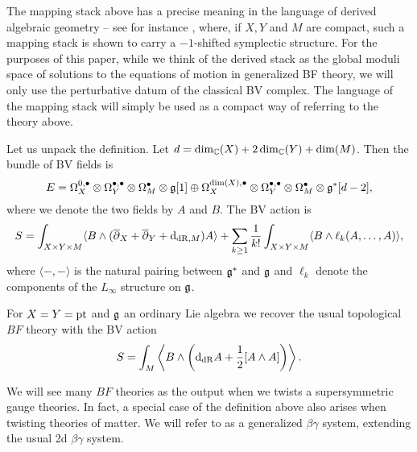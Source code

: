 \documentclass[10pt, oneside]{article}
\begin{document}

\begin{remark} \label{mapping_stack_remark}
The mapping stack above has a precise meaning in the language of derived algebraic geometry -- see for instance \cite{PTVV}, where, if $X, Y$ and $M$ are compact, such a mapping stack is shown to carry a $-1$-shifted symplectic structure.  For the purposes of this paper, while we think of the derived stack as the global moduli space of solutions to the equations of motion in generalized BF theory, we will only use the perturbative datum of the classical BV complex.  The language of the mapping stack will simply be used as a compact way of referring to the theory above. 
\end{remark}

Let us unpack the definition. Let $d = \dim_\mathbb C(X) + 2\dim_\mathbb C(Y) + \dim(M)$. Then the bundle of BV fields is
\[E = \Omega^{0,\bullet}_X \otimes \Omega^{\bullet,\bullet}_Y \otimes \Omega^\bullet_M \otimes \mathfrak g[1]\oplus \Omega^{\dim(X),\bullet}_X \otimes \Omega^{\bullet,\bullet}_Y \otimes \Omega^\bullet_M\otimes \mathfrak g^*[d-2],\]
where we denote the two fields by $A$ and $B$. The BV action is
\[S = \int_{X\times Y\times M} \langle B\wedge (\overline{\partial}_X + \overline{\partial}_Y + {\rm d}_{\mathrm{dR}, M}) A\rangle + \sum_{k\geq 1}\frac{1}{k!} \int_{X\times Y\times M} \langle B\wedge \ell_k(A, \dots, A)\rangle,\]
where $\langle -, -\rangle$ is the natural pairing between $\mathfrak g^*$ and $\mathfrak g$ and $\ell_k$ denote the components of the $L_\infty$ structure on $\mathfrak g$.

\begin{example}
For $X=Y=\operatorname{pt}$ and $\mathfrak g$ an ordinary Lie algebra we recover the usual topological $BF$ theory with the BV action
\[S = \int_M \left\langle B\wedge \left({\rm d}_{\mathrm{dR}} A+ \frac{1}{2}[A\wedge A]\right)\right\rangle.\]
\end{example}

We will see many $BF$ theories as the output when we twists a supersymmetric gauge theories.
In fact, a special case of the definition above also arises when twisting theories of matter.  We will refer to as a generalized $\beta\gamma$ system, extending the usual 2d $\beta \gamma$ system. 
\end{document}
